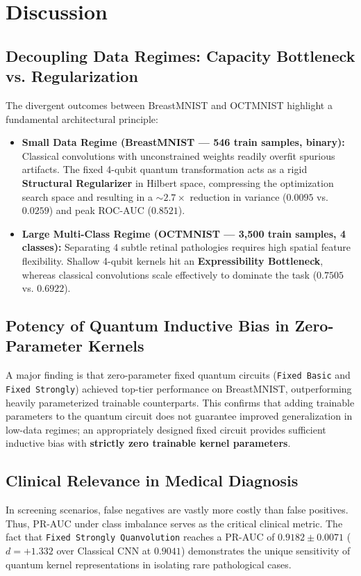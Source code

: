 \documentclass[journal]{IEEEtran}
\begin{document}
\section{Discussion}

\subsection{Decoupling Data Regimes: Capacity Bottleneck vs. Regularization}
The divergent outcomes between BreastMNIST and OCTMNIST highlight a fundamental architectural principle:
\begin{itemize}
    \item \textbf{Small Data Regime (BreastMNIST --- 546 train samples, binary):} Classical convolutions with unconstrained weights readily overfit spurious artifacts. The fixed 4-qubit quantum transformation acts as a rigid \textbf{Structural Regularizer} in Hilbert space, compressing the optimization search space and resulting in a $\sim 2.7\times$ reduction in variance ($0.0095$ vs. $0.0259$) and peak ROC-AUC ($0.8521$).
    \item \textbf{Large Multi-Class Regime (OCTMNIST --- 3,500 train samples, 4 classes):} Separating 4 subtle retinal pathologies requires high spatial feature flexibility. Shallow 4-qubit kernels hit an \textbf{Expressibility Bottleneck}, whereas classical convolutions scale effectively to dominate the task ($0.7505$ vs. $0.6922$).
\end{itemize}

\subsection{Potency of Quantum Inductive Bias in Zero-Parameter Kernels}
A major finding is that zero-parameter fixed quantum circuits (\texttt{Fixed Basic} and \texttt{Fixed Strongly}) achieved top-tier performance on BreastMNIST, outperforming heavily parameterized trainable counterparts. This confirms that adding trainable parameters to the quantum circuit does not guarantee improved generalization in low-data regimes; an appropriately designed fixed circuit provides sufficient inductive bias with \textbf{strictly zero trainable kernel parameters}.

\subsection{Clinical Relevance in Medical Diagnosis}
In screening scenarios, false negatives are vastly more costly than false positives. Thus, PR-AUC under class imbalance serves as the critical clinical metric. The fact that \texttt{Fixed Strongly Quanvolution} reaches a PR-AUC of $\mathbf{0.9182 \pm 0.0071}$ ($d = +1.332$ over Classical CNN at $0.9041$) demonstrates the unique sensitivity of quantum kernel representations in isolating rare pathological cases.
\end{document}
